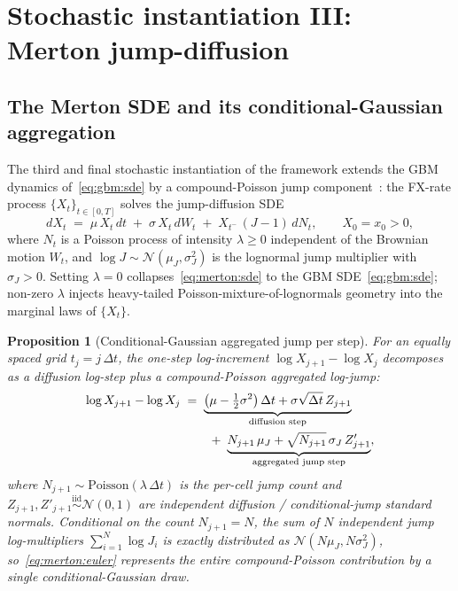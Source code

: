\documentclass[11pt,letterpaper]{article}
\newtheorem{proposition}{Proposition}[section]
\begin{document}
\section{Stochastic instantiation III: Merton jump-diffusion}
\label{sec:merton}

\subsection{The Merton SDE and its conditional-Gaussian aggregation}
\label{sec:merton:sde}

The third and final stochastic instantiation of the framework extends
the GBM dynamics of~\eqref{eq:gbm:sde} by a compound-Poisson jump
component~\cite{merton-1976, andersen-piterbarg-2010}: the FX-rate
process $\{X_{t}\}_{t \in [0, T]}$ solves the jump-diffusion SDE
\begin{equation}
    dX_{t}
    \;=\;
    \mu\,X_{t}\,dt
    \;+\; \sigma\,X_{t}\,dW_{t}
    \;+\; X_{t^{-}}\,(J - 1)\,dN_{t},
    \qquad X_{0} = x_{0} > 0,
    \label{eq:merton:sde}
\end{equation}
where $N_{t}$ is a Poisson process of intensity $\lambda \geq 0$
independent of the Brownian motion $W_{t}$, and $\log J \sim
\mathcal{N}(\mu_{J}, \sigma_{J}^{2})$ is the lognormal jump multiplier
with $\sigma_{J} > 0$. Setting $\lambda = 0$ collapses~\eqref{eq:merton:sde}
to the GBM SDE~\eqref{eq:gbm:sde}; non-zero $\lambda$ injects
heavy-tailed Poisson-mixture-of-lognormals geometry into the marginal
laws of $\{X_{t}\}$.

\begin{proposition}[Conditional-Gaussian aggregated jump per step]
\label{prop:merton:disc}
For an equally spaced grid $t_{j} = j\,\Delta t$, the one-step log-increment
$\log X_{j+1} - \log X_{j}$ decomposes as a diffusion log-step plus a
\emph{compound-Poisson aggregated} log-jump:
\begin{align}
    \log X_{j+1} - \log X_{j}
    \;&=\;
    \underbrace{\bigl(\mu - \tfrac{1}{2}\sigma^{2}\bigr)\,\Delta t
                + \sigma\sqrt{\Delta t}\,Z_{j+1}}_{\text{diffusion step}}
    \notag\\
    \;&\qquad+\;
    \underbrace{N_{j+1}\,\mu_{J}
                + \sqrt{N_{j+1}}\,\sigma_{J}\,Z'_{j+1}}_{\text{aggregated jump step}},
    \label{eq:merton:euler}
\end{align}
where $N_{j+1} \sim \mathrm{Poisson}(\lambda\,\Delta t)$ is the per-cell
jump count and $Z_{j+1}, Z'_{j+1} \stackrel{\text{iid}}{\sim} \mathcal{N}(0, 1)$
are independent diffusion / conditional-jump standard normals. Conditional
on the count $N_{j+1} = N$, the sum of $N$ independent jump log-multipliers
$\sum_{i=1}^{N}\log J_{i}$ is exactly distributed as
$\mathcal{N}(N\mu_{J}, N\sigma_{J}^{2})$, so~\eqref{eq:merton:euler}
represents the entire compound-Poisson contribution by a single
conditional-Gaussian draw.
\end{proposition}
\end{document}
